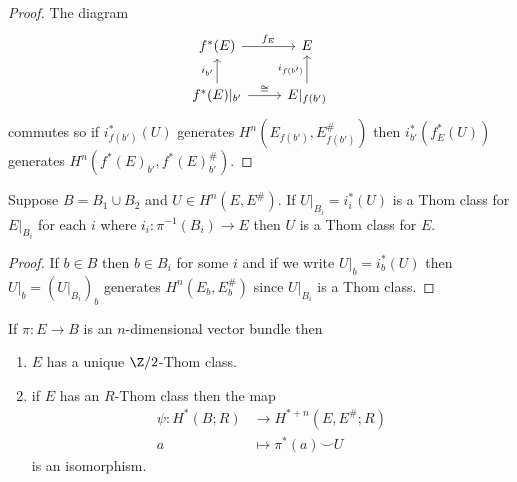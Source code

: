 \documentclass[a4paper]{article}
\newcommand*{\cp}{\smile} %
\begin{document}
\begin{proof}
  The diagram
  \[
    \begin{tikzcd}
      f^*(E) \ar[r, "f_E"] & E \\
      f^*(E)|_{b'} \ar[r, "\cong"] \ar[u, "i_{b'}"] & E|_{f(b')} \ar[u, "i_{f(b')}"]
    \end{tikzcd}
  \]
  commutes so if \(i_{f(b')}^*(U)\) generates \(H^n(E_{f(b')}, E_{f(b')}^\#)\) then \(i_{b'}^*(f_E^*(U))\) generates \(H^n(f^*(E)_{b'}, f^*(E)_{b'}^\#)\).
\end{proof}

\begin{lemma}
  Suppose \(B = B_1 \cup B_2\) and \(U \in H^n(E, E^\#)\). If \(U|_{B_i} = i_i^*(U)\) is a Thom class for \(E|_{B_i}\) for each \(i\) where \(i_i: \pi^{-1}(B_i) \to E\) then \(U\) is a Thom class for \(E\).
\end{lemma}

\begin{proof}
  If \(b \in B\) then \(b \in B_i\) for some \(i\) and if we write \(U|_b = i_b^*(U)\) then \(U|_b = (U|_{B_i})_b\) generates \(H^n(E_b, E_b^\#)\) since \(U|_{B_i}\) is a Thom class.
\end{proof}

\begin{theorem}
  If \(\pi: E \to B\) is an \(n\)-dimensional vector bundle then
  \begin{enumerate}
  \item \(E\) has a unique \(\Z/2\)-Thom class.
  \item if \(E\) has an \(R\)-Thom class then the map
    \begin{align*}
      \psi: H^*(B; R) &\to H^{* + n}(E, E^\#; R) \\
      a &\mapsto \pi^*(a) \cp U
    \end{align*}
    is an isomorphism.
  \end{enumerate}
\end{theorem}
\end{document}
